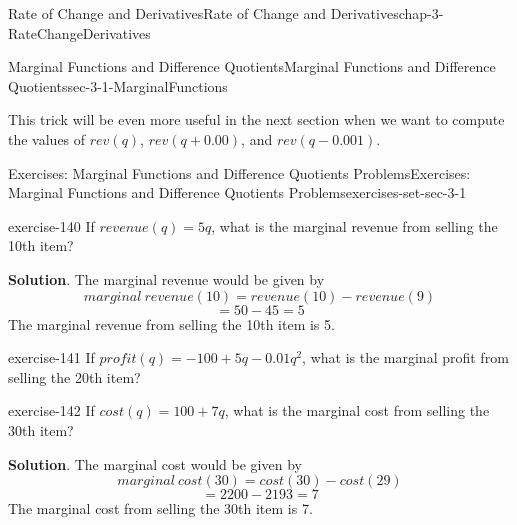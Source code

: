 \documentclass[oneside,10pt,]{book}
\numberwithin{equation}{section}
\begin{document}
\begin{chapterptx}{Rate of Change and Derivatives}{}{Rate of Change and Derivatives}{}{}{chap-3-RateChangeDerivatives}
\begin{sectionptx}{Marginal Functions and Difference Quotients}{}{Marginal Functions and Difference Quotients}{}{}{sec-3-1-MarginalFunctions}
\begin{sidebyside}{1}{0.1}{0.1}{0}
\begin{sbspanel}{0.8}
\end{sbspanel}%
\end{sidebyside}%
\par
\hypertarget{p-942}{}%
This trick will be even more useful in the next section when we want to compute the values of \(rev(q)\), \(rev(q+0.00)\), and \(rev(q-0.001)\).%
%
%
\typeout{************************************************}
\typeout{************************************************}
%
\begin{exercises-subsection-numberless}{Exercises: Marginal Functions and Difference Quotients Problems}{}{Exercises: Marginal Functions and Difference Quotients Problems}{}{}{exercises-set-sec-3-1}
\begin{divisionexercise}{1}{}{}{exercise-140}%
\hypertarget{p-943}{}%
If \(revenue(q)=5q\), what is the marginal revenue from selling the 10th item?%
\par\smallskip%
\noindent\textbf{Solution}.\hypertarget{solution-68}{}\quad%
\hypertarget{p-944}{}%
The marginal revenue would be given by%
%
\begin{equation*}
marginal\ revenue(10)=revenue(10)-revenue(9)
\end{equation*}
%
\begin{equation*}
=50-45=5
\end{equation*}
\hypertarget{p-945}{}%
The marginal revenue from selling the 10th item is \textdollar{}5.%
\end{divisionexercise}%
\begin{divisionexercise}{2}{}{}{exercise-141}%
\hypertarget{p-946}{}%
If \(profit(q)=-100+5q-0.01q^2\), what is the marginal profit from selling the 20th item?%
\end{divisionexercise}%
\begin{divisionexercise}{3}{}{}{exercise-142}%
\hypertarget{p-947}{}%
If \(cost(q)=100+7q\), what is the marginal cost from selling the 30th item?%
\par\smallskip%
\noindent\textbf{Solution}.\hypertarget{solution-69}{}\quad%
\hypertarget{p-948}{}%
The marginal cost would be given by%
%
\begin{equation*}
marginal\ cost(30)=cost(30)-cost(29)
\end{equation*}
%
\begin{equation*}
=2200-2193=7
\end{equation*}
\hypertarget{p-949}{}%
The marginal cost from selling the 30th item is \textdollar{}7.%
\end{divisionexercise}%

\end{exercises-subsection-numberless}
\end{sectionptx}
\end{chapterptx}
\end{document}

